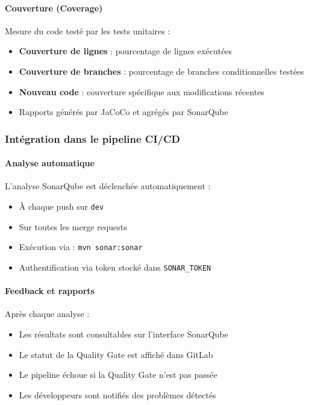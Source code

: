 \paragraph{Couverture (Coverage)}

Mesure du code testé par les tests unitaires :
\begin{itemize}
    \item \textbf{Couverture de lignes} : pourcentage de lignes exécutées
    \item \textbf{Couverture de branches} : pourcentage de branches conditionnelles testées
    \item \textbf{Nouveau code} : couverture spécifique aux modifications récentes
    \item Rapports générés par JaCoCo et agrégés par SonarQube
\end{itemize}

\subsubsection{Intégration dans le pipeline CI/CD}

\paragraph{Analyse automatique}

L'analyse SonarQube est déclenchée automatiquement :
\begin{itemize}
    \item À chaque push sur \texttt{dev}
    \item Sur toutes les merge requests
    \item Exécution via : \texttt{mvn sonar:sonar}
    \item Authentification via token stocké dans \texttt{SONAR\_TOKEN}
\end{itemize}

\paragraph{Feedback et rapports}

Après chaque analyse :
\begin{itemize}
    \item Les résultats sont consultables sur l'interface SonarQube
    \item Le statut de la Quality Gate est affiché dans GitLab
    \item Le pipeline échoue si la Quality Gate n'est pas passée
    \item Les développeurs sont notifiés des problèmes détectés
\end{itemize}

